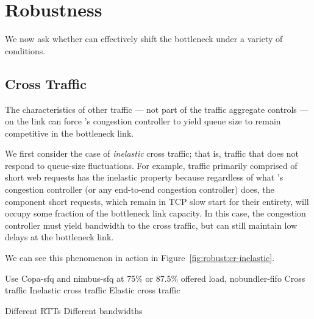\section{Robustness}\label{s:robust}

We now ask whether \name can effectively shift the bottleneck under a variety of conditions.

\subsection{Cross Traffic}\label{s:robust:cross}

The characteristics of other traffic --- not part of the traffic aggregate \name controls --- on the link can force \name's congestion controller to yield queue size to remain competitive in the bottleneck link.

 We first consider the case of \emph{inelastic} cross traffic; that is, traffic that does not respond to queue-size fluctuations.
For example, traffic primarily comprised of short web requests has the inelastic property because regardless of what \name's congestion controller (or any end-to-end congestion controller) does, the component short requests, which remain in TCP slow start for their entirety, will occupy some fraction of the bottleneck link capacity.
In this case, the congestion controller must yield bandwidth to the cross traffic, but can still maintain low delays at the bottleneck link.


We can see this phenomenon in action in Figure~\ref{fig:robust:cr-inelastic}.

\begin{outline}
\1 Use Copa-sfq and nimbus-sfq at 75\% or 87.5\% offered load, nobundler-fifo
\1 Cross traffic
\2 Inelastic cross traffic
\2 Elastic cross traffic

\1 Different RTTs
\1 Different bandwidths
\end{outline}
